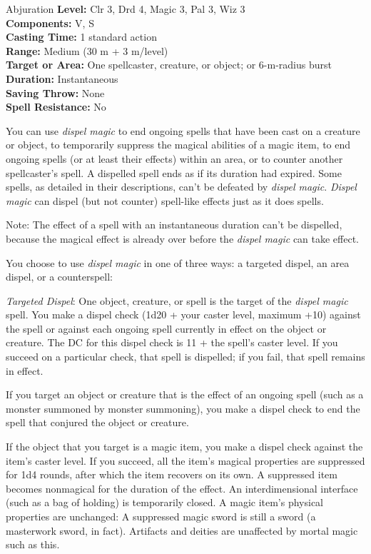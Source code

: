 {Abjuration}
{
	\textbf{Level:}
	Clr 3, Drd 4, Magic 3, Pal 3, Wiz 3\\
	\textbf{Components:}
	V, S\\
	\textbf{Casting Time:}
	1 standard action\\
	\textbf{Range:}
	Medium (30 m + 3 m/level)\\
	\textbf{Target or Area:}
	One spellcaster, creature, or object; or 6-m-radius burst\\
	\textbf{Duration:}
	Instantaneous\\
	\textbf{Saving Throw:}
	None\\
	\textbf{Spell Resistance:}
	No\\
}
{
	You can use \emph{dispel magic} to end ongoing spells that have been cast on a creature or object, to temporarily suppress the magical abilities of a magic item, to end ongoing spells (or at least their effects) within an area, or to counter another spellcaster's spell. A dispelled spell ends as if its duration had expired. Some spells, as detailed in their descriptions, can't be defeated by \emph{dispel magic}. \emph{Dispel magic} can dispel (but not counter) spell-like effects just as it does spells.

	Note: The effect of a spell with an instantaneous duration can't be dispelled, because the magical effect is already over before the \emph{dispel magic} can take effect.

	You choose to use \emph{dispel magic} in one of three ways: a targeted dispel, an area dispel, or a counterspell:

	\textit{Targeted Dispel}:
	One object, creature, or spell is the target of the \emph{dispel magic} spell. You make a dispel check (1d20 + your caster level, maximum +10) against the spell or against each ongoing spell currently in effect on the object or creature. The DC for this dispel check is 11 + the spell's caster level. If you succeed on a particular check, that spell is dispelled; if you fail, that spell remains in effect.

	If you target an object or creature that is the effect of an ongoing spell (such as a monster summoned by monster summoning), you make a dispel check to end the spell that conjured the object or creature.

	If the object that you target is a magic item, you make a dispel check against the item's caster level. If you succeed, all the item's magical properties are suppressed for 1d4 rounds, after which the item recovers on its own. A suppressed item becomes nonmagical for the duration of the effect. An interdimensional interface (such as a bag of holding) is temporarily closed. A magic item's physical properties are unchanged: A suppressed magic sword is still a sword (a masterwork sword, in fact). Artifacts and deities are unaffected by mortal magic such as this.

}
